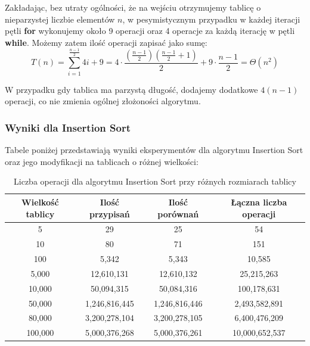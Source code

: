 \documentclass{article}
\begin{document}
Zakładając, bez utraty ogólności, że na wejściu otrzymujemy tablicę o nieparzystej liczbie elementów \( n \), w pesymistycznym przypadku w każdej iteracji pętli \textbf{for} wykonujemy około 9 operacji oraz 4 operacje za każdą iterację w pętli \textbf{while}. Możemy zatem ilość operacji zapisać jako sumę:
\[
    T(n) = \sum_{i=1}^{\frac{n-1}{2}} 4i + 9 = 4 \cdot \frac{\left(\frac{n-1}{2}\right)\left(\frac{n-1}{2} + 1\right)}{2} + 9 \cdot \frac{n-1}{2} = \Theta(n^2)
\]

W przypadku gdy tablica ma parzystą długość, dodajemy dodatkowe \( 4(n-1) \) operacji, co nie zmienia ogólnej złożoności algorytmu.
\subsubsection{Wyniki dla Insertion Sort}
Tabele poniżej przedstawiają wyniki eksperymentów dla algorytmu Insertion Sort oraz jego modyfikacji na tablicach o różnej wielkości:
\begin{table}[H]
    \centering
    \begin{tabular}{|c|c|c|c|}
    \hline
    \textbf{Wielkość tablicy} & \textbf{Ilość przypisań} & \textbf{Ilość porównań} & \textbf{Łączna liczba operacji} \\ \hline
    5 & 29 & 25 & 54 \\ \hline
    10 & 80 & 71 & 151 \\ \hline
    100 & 5,342 & 5,343 & 10,585 \\ \hline
    5,000 & 12,610,131 & 12,610,132 & 25,215,263 \\ \hline
    10,000 & 50,094,315 & 50,084,316 & 100,178,631 \\ \hline
    50,000 & 1,246,816,445 & 1,246,816,446 & 2,493,582,891 \\ \hline
    80,000 & 3,200,278,104 & 3,200,278,105 & 6,400,476,209 \\ \hline
    100,000 & 5,000,376,268 & 5,000,376,261 & 10,000,652,537 \\ \hline
    \end{tabular}
    \caption{Liczba operacji dla algorytmu Insertion Sort przy różnych rozmiarach tablicy}
    \label{tab:insertion_results}
\end{table}
\end{document}
